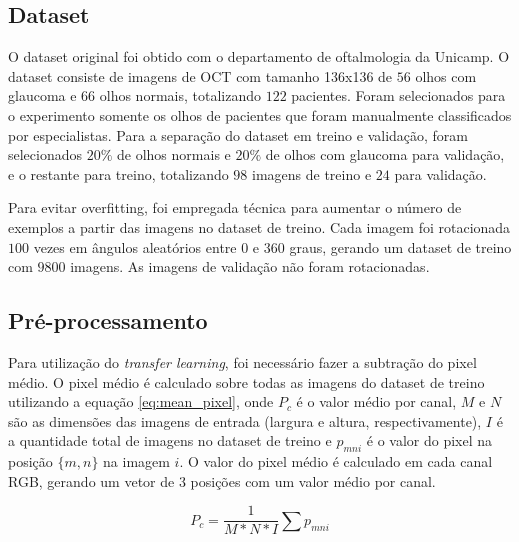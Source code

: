 \documentclass[conference]{IEEEtran}
\begin{document}
  \subsection{Dataset}


  O dataset original foi obtido com o departamento de oftalmologia da Unicamp. O dataset consiste de imagens de OCT com tamanho 136x136 de $56$ olhos com glaucoma e $66$ olhos normais, totalizando $122$ pacientes. Foram selecionados para o experimento somente os olhos de pacientes que foram manualmente classificados por especialistas. Para a separação do dataset em treino e validação, foram selecionados $20\%$ de olhos normais e $20\%$ de olhos com glaucoma para validação, e o restante para treino, totalizando $98$ imagens de treino e $24$ para validação.

  Para evitar overfitting, foi empregada técnica para aumentar o número de exemplos a partir das imagens no dataset de treino. Cada imagem foi rotacionada $100$ vezes em ângulos aleatórios entre $0$ e $360$ graus, gerando um dataset de treino com $9800$ imagens. As imagens de validação não foram rotacionadas.

  \subsection{Pré-processamento}


  
  
  Para utilização do \textit{transfer learning}, foi necessário fazer a subtração do pixel médio. O pixel médio é calculado sobre todas as imagens do dataset de treino utilizando a equação \ref{eq:mean_pixel}, onde $P_c$ é o valor médio por canal, $M$ e $N$ são as dimensões das imagens de entrada (largura e altura, respectivamente), $I$ é a quantidade total de imagens no dataset de treino e $p_{mni}$ é o valor do pixel na posição $\{m,n\}$ na imagem $i$. O valor do pixel médio é calculado em cada canal RGB, gerando um vetor de 3 posições com um valor médio por canal.


  \begin{equation}
    P_c = \frac{1}{M * N * I} \sum p_{mni}
    \label{eq:mean_pixel}
  \end{equation}
\end{document}
